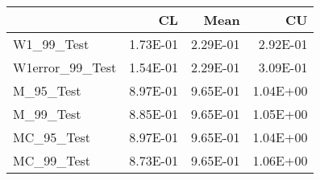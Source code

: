 \begin{tabular}{lrrr}
\toprule
{} &       CL &     Mean &       CU \\
\midrule
W1\_99\_Test      & 1.73E-01 & 2.29E-01 & 2.92E-01 \\
W1error\_99\_Test & 1.54E-01 & 2.29E-01 & 3.09E-01 \\
M\_95\_Test       & 8.97E-01 & 9.65E-01 & 1.04E+00 \\
M\_99\_Test       & 8.85E-01 & 9.65E-01 & 1.05E+00 \\
MC\_95\_Test      & 8.97E-01 & 9.65E-01 & 1.04E+00 \\
MC\_99\_Test      & 8.73E-01 & 9.65E-01 & 1.06E+00 \\
\bottomrule
\end{tabular}

